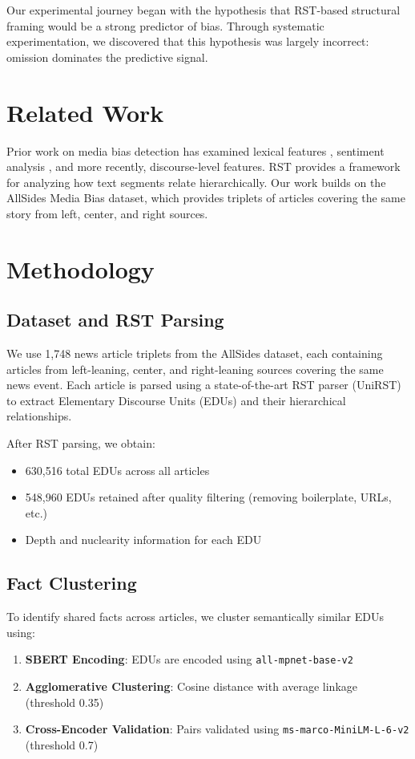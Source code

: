 \documentclass[11pt]{article}
\begin{document}
Our experimental journey began with the hypothesis that RST-based structural framing would be a strong predictor of bias. Through systematic experimentation, we discovered that this hypothesis was largely incorrect: omission dominates the predictive signal.

\section{Related Work}

Prior work on media bias detection has examined lexical features \cite{}, sentiment analysis \cite{}, and more recently, discourse-level features. RST \cite{mann1988rhetorical} provides a framework for analyzing how text segments relate hierarchically. Our work builds on the AllSides Media Bias dataset, which provides triplets of articles covering the same story from left, center, and right sources.

\section{Methodology}

\subsection{Dataset and RST Parsing}

We use 1,748 news article triplets from the AllSides dataset, each containing articles from left-leaning, center, and right-leaning sources covering the same news event. Each article is parsed using a state-of-the-art RST parser (UniRST) to extract Elementary Discourse Units (EDUs) and their hierarchical relationships.

After RST parsing, we obtain:
\begin{itemize}
    \item 630,516 total EDUs across all articles
    \item 548,960 EDUs retained after quality filtering (removing boilerplate, URLs, etc.)
    \item Depth and nuclearity information for each EDU
\end{itemize}

\subsection{Fact Clustering}

To identify shared facts across articles, we cluster semantically similar EDUs using:
\begin{enumerate}
    \item \textbf{SBERT Encoding}: EDUs are encoded using \texttt{all-mpnet-base-v2}
    \item \textbf{Agglomerative Clustering}: Cosine distance with average linkage (threshold 0.35)
    \item \textbf{Cross-Encoder Validation}: Pairs validated using \texttt{ms-marco-MiniLM-L-6-v2} (threshold 0.7)
\end{enumerate}
\end{document}
